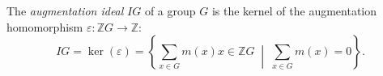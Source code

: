 The \emph{augmentation ideal} $IG$ of a group $G$ is the kernel of the augmentation homomorphism $\varepsilon: \mathbb{Z}G \to \mathbb{Z}$:
$$IG = \ker(\varepsilon) = \left\{ \sum_{x \in G} m(x) x \in \mathbb{Z}G \;\middle|\; \sum_{x \in G} m(x) = 0 \right\}.$$
